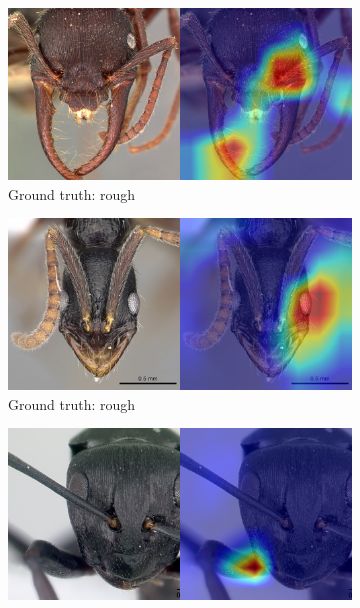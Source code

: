 \documentclass{aci}
\numberwithin{equation}{section}
\begin{document}
\begin{figure}
    \centering
    \begin{subfigure}{\subwidth}
        \includegraphics[width=1\linewidth]{thesis_assets/gradcam/incorrect_nonideal/1.png}
        \caption{Ground truth: rough}
        \label{fig:incorrect_nonideal_1}
    \end{subfigure}
    \begin{subfigure}{\subwidth}
        \includegraphics[width=1\linewidth]{thesis_assets/gradcam/incorrect_nonideal/22.png}
        \caption{Ground truth: rough}
        \label{fig:incorrect_nonideal_22}
    \end{subfigure}
    \begin{subfigure}{\subwidth}
        \includegraphics[width=1\linewidth]{thesis_assets/gradcam/incorrect_nonideal/61.png}

\end{subfigure}
\end{figure}
\end{document}
